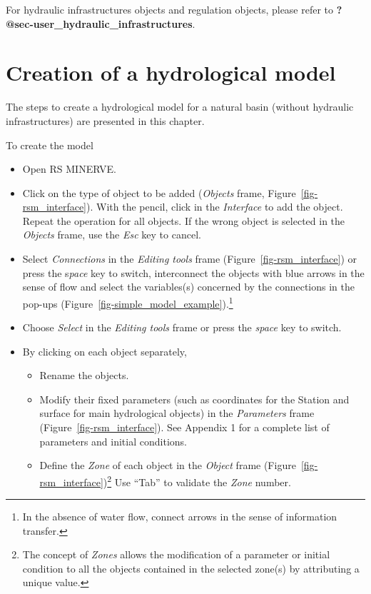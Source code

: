 \documentclass[
  letterpaper,
  DIV=11,
  numbers=noendperiod]{scrreprt}
\begin{document}
For hydraulic infrastructures objects and regulation objects, please
refer to \textbf{?@sec-user\_hydraulic\_infrastructures}.

\hypertarget{sec-user_rainfall_runoff_creation_model}{%
\chapter{Creation of a hydrological
model}\label{sec-user_rainfall_runoff_creation_model}}

The steps to create a hydrological model for a natural basin (without
hydraulic infrastructures) are presented in this chapter.

To create the model

\begin{itemize}
\item
  {Open RS MINERVE.}
\item
  {Click on the type of object to be added (\emph{Objects} frame,
  Figure~\ref{fig-rsm_interface}). With the pencil, click in the
  \emph{Interface} to add the object. Repeat the operation for all
  objects. If the wrong object is selected in the \emph{Objects} frame,
  use the \emph{Esc} key to cancel.}
\item
  {Select \emph{Connections} in the \emph{Editing tools} frame
  (Figure~\ref{fig-rsm_interface}) or press the s\emph{pace} key to
  switch, interconnect the objects with blue arrows in the sense of flow
  and select the variables(s) concerned by the connections in the
  pop-ups (Figure~\ref{fig-simple_model_example}).\footnote{In the
    absence of water flow, connect arrows in the sense of information
    transfer.}}
\item
  {Choose \emph{Select} in the \emph{Editing tools} frame or press the
  \emph{space} key to switch.}
\item
  {By clicking on each object separately,}

  \begin{itemize}
  \item
    {Rename the objects.}
  \item
    {Modify their fixed parameters (such as coordinates for the Station
    and surface for main hydrological objects) in the \emph{Parameters}
    frame (Figure~\ref{fig-rsm_interface}). See Appendix 1 for a
    complete list of parameters and initial conditions.}
  \item
    {Define the \emph{Zone} of each object in the \emph{Object} frame
    (Figure~\ref{fig-rsm_interface})\footnote{The concept of
      \emph{Zones} allows the modification of a parameter or initial
      condition to all the objects contained in the selected zone(s) by
      attributing a unique value.}} {Use ``Tab'' to validate the
    \emph{Zone} number.}
  \end{itemize}
\end{itemize}
\end{document}
